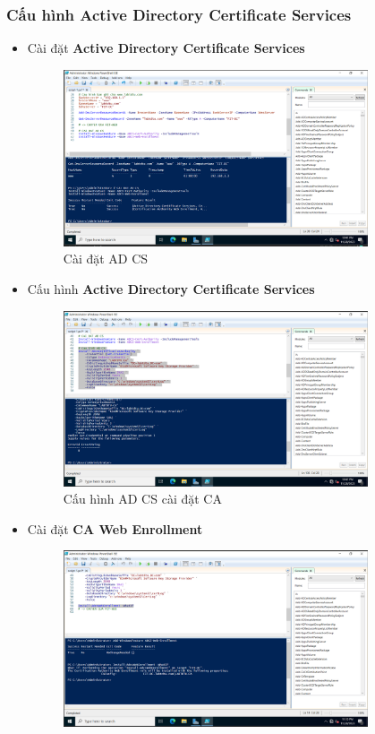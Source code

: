 \documentclass[13pt]{report}
\begin{document}
	\subsubsection{Cấu hình Active Directory Certificate Services}
	\begin{itemize}
		\item Cài đặt \textbf{Active Directory Certificate Services}
		\begin{figure}[htp]
			\centering
			\includegraphics[width=0.85\textwidth]{image/PowerShell/ADCS/1.png}
			\caption{Cài đặt AD CS}
		\end{figure}
		\newpage
		\item Cấu hình \textbf{Active Directory Certificate Services}
		\begin{figure}[htp]
			\centering
			\includegraphics[width=0.85\textwidth]{image/PowerShell/ADCS/2.png}
			\caption{Cấu hình AD CS cài đặt CA}
		\end{figure}
		\item Cài đặt \textbf{CA Web Enrollment}
		\begin{figure}[htp]
			\centering
			\includegraphics[width=0.85\textwidth]{image/PowerShell/ADCS/3.png}

\end{figure}
\end{itemize}
\end{document}
